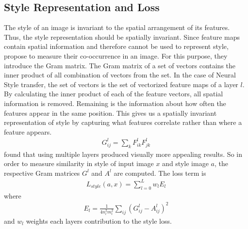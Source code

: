 \documentclass{seminar}
\begin{document}
\subsection{Style Representation and Loss}
The style of an image is invariant to the spatial arrangement of its features. Thus, the style representation should be spatially invariant. Since feature maps contain spatial information and therefore cannot be used to represent style, \cite{gatys2015neural} propose to measure their co-occurrence in an image. For this purpose, they introduce the Gram matrix.
The Gram matrix of a set of vectors contains the inner product of all combination of vectors from the set. In the case of Neural Style transfer, the set of vectors is the set of vectorized feature maps of a layer $l$.
By calculating the inner product of each of the feature vectors, all spatial information is removed. Remaining is the information about how often the features appear in the same position. This gives us a spatially invariant representation of style by capturing what features correlate rather than where a feature appears.
\begin{align}
	G^l_{ij} = \sum_{k} F^l_{ik}F^l_{jk}
\end{align}
\cite{gatys2015neural} found that using multiple layers produced visually more appealing results. So in order to measure similarity in style of input image $x$ and style image $a$, the respective Gram matrices $G^l$ and $A^l$ are computed. 
The loss term is
\begin{align*}
	L_{style}(a,x) = \sum^L_{l=0}w_l E_l
\end{align*}
where 
\begin{align*}
	E_l = \frac{1}{4n^2_lm^2_l}\sum_{ij}(G^l_{ij}-A^l_{ij})^2
\end{align*}
and $w_l$ weights each layers contribution to the style loss.
\end{document}
